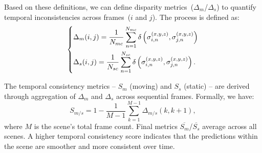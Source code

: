Based on these definitions, we can define disparity metrics~($\Delta_{m}$/$\Delta_{s}$) to quantify temporal inconsistencies across frames~($i$ and $j$). The process is defined as:
\begin{equation}
\begin{dcases}
\Delta_{m}(i,j) = \dfrac{1}{N_{mc}} \sum\limits_{n=1}^{N_{mc}} \delta\left(\sigma_{i,n}^{(x,y,z)}, \sigma_{j,n}^{(x,y,z)}\right) \\
\Delta_{s}(i,j) = \dfrac{1}{N_{sc}} \sum\limits_{n=1}^{N_{sc}} \delta\left(\sigma_{i,n}^{(x,y,z)}, \sigma_{j,n}^{(x,y,z)}\right).
\end{dcases}
\label{eq:disparity}
\end{equation}

The temporal consistency metrics -- $S_m$ (moving) and $S_s$ (static) -- are derived through aggregation of $\Delta_{m}$ and $\Delta_{s}$ across sequential frames. Formally, we have:
\begin{equation}
S_{m/s} = 1 - \dfrac{1}{M-1} \sum\limits_{k=1}^{M-1} \Delta_{m/s}(k,k+1),
\label{eq:consistency_scores}
\end{equation}
where $M$ is the scene's total frame count. Final metrics $\overline{S_m}$/$\overline{S_s}$ average across all scenes. A higher temporal consistency score indicates that the predictions within the scene are smoother and more consistent over time.

